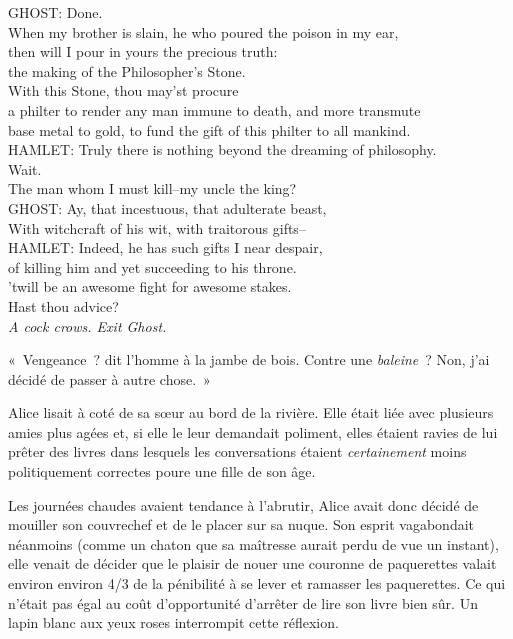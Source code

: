 \begin{playdialog}
GHOST: Done.\\
When my brother is slain, he who poured the poison in my ear,\\
then will I pour in yours the precious truth:\\
the making of the Philosopher’s Stone.\\
With this Stone, thou may’st procure\\
a philter to render any man immune to death, and more transmute\\ base metal to gold, to fund the gift of this philter to all mankind.\\

HAMLET: Truly there is nothing beyond the dreaming of philosophy.\\ Wait.\\ The man whom I must kill--my uncle the king?\\

GHOST: Ay, that incestuous, that adulterate beast,\\
With witchcraft of his wit, with traitorous gifts--\\

HAMLET: Indeed, he has such gifts I near despair,\\
of killing him and yet succeeding to his throne.\\
’twill be an awesome fight for awesome stakes.\\
Hast thou advice?\\

\emph{A cock crows. Exit Ghost.}
\end{playdialog}

\pagebreak[2]

«~Vengeance~? dit l'homme à la jambe de bois. Contre une \emph{baleine}~? Non, j'ai décidé de passer à autre chose.~»

\pagebreak[1]

Alice lisait à coté de sa sœur au bord de la rivière. Elle était liée avec plusieurs amies plus agées et, si elle le leur demandait poliment, elles étaient ravies de lui prêter des livres dans lesquels les conversations étaient \emph{certainement} moins politiquement correctes poure une fille de son âge.

Les journées chaudes avaient tendance à l'abrutir, Alice avait donc décidé de mouiller son couvrechef et de le placer sur sa nuque. Son esprit vagabondait néanmoins (comme un chaton que sa maîtresse aurait perdu de vue un instant), elle venait de décider que le plaisir de nouer une couronne de paquerettes valait environ environ 4/3 de la pénibilité à se lever et ramasser les paquerettes. Ce qui n'était pas égal au coût d'opportunité d'arrêter de lire son livre bien sûr. Un lapin blanc aux yeux roses interrompit cette réflexion.

